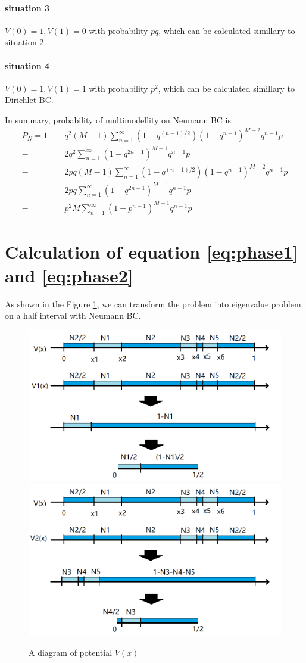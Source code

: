 \documentclass[12pt,a4paper]{article}
\begin{document}
\begin{appendices}
\paragraph*{situation 3}
$V(0) = 1, V(1) = 0$ with probability $p q$, which can be calculated simillary to situation 2.

\paragraph*{situation 4}
$V(0) = 1, V(1) = 1$ with probability $p^2$, which can be calculated simillary to Dirichlet BC.

In summary, probability of multimodellity on Neumann BC is
\begin{align*}
P_N = 1 - & q^2 (M-1) \sum_{n=1}^{\infty} (1 - q^{(n-1)/2}) (1 - q^{n-1})^{M-2} q^{n-1} p \\
- & 2 q^2 \sum_{n=1}^{\infty} (1 - q^{2n-1})^{M-1} q^{n-1} p \\
- & 2 p q (M-1) \sum_{n=1}^{\infty} (1 - q^{(n-1)/2}) (1 - q^{n-1})^{M-2} q^{n-1} p \\
- & 2 p q \sum_{n=1}^{\infty} (1 - q^{2n-1})^{M-1} q^{n-1} p \\
- & p^2 M \sum_{n=1}^{\infty} (1 - p^{n-1})^{M-1} q^{n-1} p
\end{align*}

\section{Calculation of equation \ref{eq:phase1} and \ref{eq:phase2}}

As shown in the Figure \ref{fig:11b}, we can transform the problem into eigenvalue problem on a half interval with Neumann BC.

\begin{figure}[h]
\centering
\includegraphics[width=0.49\linewidth]{PV1a}
\includegraphics[width=0.49\linewidth]{PV2a}
\caption{A diagram of potential $V(x)$}
\label{fig:11b}
\end{figure}


\end{appendices}
\end{document}
